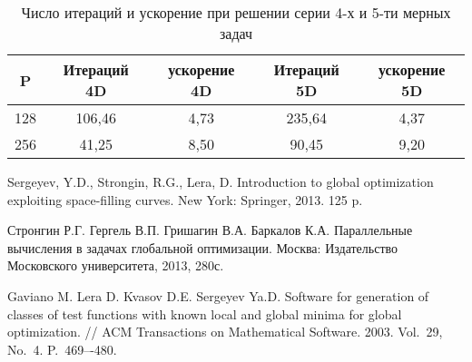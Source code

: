 \documentclass[11pt, oneside, a4paper]{article}
\begin{document}
\begin{table}[!hbp]
    \centering
    \caption{Число итераций и ускорение при решении серии 4-х и 5-ти мерных задач}
    \begin{tabular}{|c|c|c|c|c|}
    \hline
    P    & Итераций 4D & ускорение 4D &         Итераций 5D & ускорение 5D \\ \hline
	128 & 106,46   & 4,73      &         235,64   & 4,37      \\ \hline
	256 & 41,25    & 8,50      &         90,45    & 9,20      \\ \hline
	\end{tabular}
    
    \label{table:GKLS_RES}
\end{table}



\begin{biblio}



Sergeyev, Y.D., Strongin, R.G., Lera, D. Introduction to global optimization exploiting space-filling curves. 
New York: Springer, 2013. 125 p.



Стронгин Р.Г. Гергель В.П. Гришагин В.А. Баркалов К.А. Параллельные вычисления
в задачах глобальной оптимизации.
Москва: Издательство Московского университета,
2013, 280с.

Gaviano M. Lera D. Kvasov D.E. Sergeyev Ya.D. Software for generation of classes of test functions with known local and global minima for global optimization. // ACM Transactions on Mathematical Software. 2003. Vol.~29, No.~4. P.~469–-480.



\end{biblio}
\end{document}
